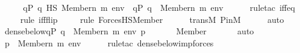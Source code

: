 \begin{isabellebody}
\ \ \isamarkupfalse%
\ \isamarkupfalse%
\ {\isachardoublequoteopen}{\isacharbraceleft}{\kern0pt}q{\isasymin}P{\isachardot}{\kern0pt}\ {\isacharparenleft}{\kern0pt}q\ {\isasymtturnstile}HS\ {\isacharparenleft}{\kern0pt}Member{\isacharparenleft}{\kern0pt}n{\isacharcomma}{\kern0pt}\ m{\isacharparenright}{\kern0pt}{\isacharparenright}{\kern0pt}\ env{\isacharparenright}{\kern0pt}{\isacharbraceright}{\kern0pt}\ {\isacharequal}{\kern0pt}\ {\isacharbraceleft}{\kern0pt}q{\isasymin}P{\isachardot}{\kern0pt}\ {\isacharparenleft}{\kern0pt}q\ {\isasymtturnstile}\ {\isacharparenleft}{\kern0pt}Member{\isacharparenleft}{\kern0pt}n{\isacharcomma}{\kern0pt}\ m{\isacharparenright}{\kern0pt}{\isacharparenright}{\kern0pt}\ env{\isacharparenright}{\kern0pt}{\isacharbraceright}{\kern0pt}{\isachardoublequoteclose}\ \isanewline
\ \ \ \ \isamarkupfalse%
{\isacharparenleft}{\kern0pt}rule{\isacharunderscore}{\kern0pt}tac\ iff{\isacharunderscore}{\kern0pt}eq{\isacharparenright}{\kern0pt}\isanewline
\ \ \ \ \isamarkupfalse%
{\isacharparenleft}{\kern0pt}rule\ iff{\isacharunderscore}{\kern0pt}flip{\isacharparenright}{\kern0pt}\isanewline
\ \ \ \ \isamarkupfalse%
{\isacharparenleft}{\kern0pt}rule\ ForcesHS{\isacharunderscore}{\kern0pt}Member{\isacharparenright}{\kern0pt}\isanewline
\ \ \ \ \isamarkupfalse%
\ transM\ P{\isacharunderscore}{\kern0pt}in{\isacharunderscore}{\kern0pt}M\isanewline
\ \ \ \ \isamarkupfalse%
\ auto\isanewline
\ \ \isamarkupfalse%
\ \isamarkupfalse%
\ {\isachardoublequoteopen}dense{\isacharunderscore}{\kern0pt}below{\isacharparenleft}{\kern0pt}{\isacharbraceleft}{\kern0pt}q{\isasymin}P{\isachardot}{\kern0pt}\ {\isacharparenleft}{\kern0pt}q\ {\isasymtturnstile}\ {\isacharparenleft}{\kern0pt}Member{\isacharparenleft}{\kern0pt}n{\isacharcomma}{\kern0pt}\ m{\isacharparenright}{\kern0pt}{\isacharparenright}{\kern0pt}\ env{\isacharparenright}{\kern0pt}{\isacharbraceright}{\kern0pt}{\isacharcomma}{\kern0pt}\ p{\isacharparenright}{\kern0pt}{\isachardoublequoteclose}\ \isanewline
\ \ \ \ \isamarkupfalse%
\ Member\ \isanewline
\ \ \ \ \isamarkupfalse%
\ auto\isanewline
\ \ \isamarkupfalse%
\ \isamarkupfalse%
\ {\isachardoublequoteopen}p\ {\isasymtturnstile}\ Member{\isacharparenleft}{\kern0pt}n{\isacharcomma}{\kern0pt}\ m{\isacharparenright}{\kern0pt}\ env{\isachardoublequoteclose}\ \isanewline
\ \ \ \ \isamarkupfalse%
{\isacharparenleft}{\kern0pt}rule{\isacharunderscore}{\kern0pt}tac\ dense{\isacharunderscore}{\kern0pt}below{\isacharunderscore}{\kern0pt}imp{\isacharunderscore}{\kern0pt}forces{\isacharparenright}{\kern0pt}\isanewline

\end{isabellebody}
